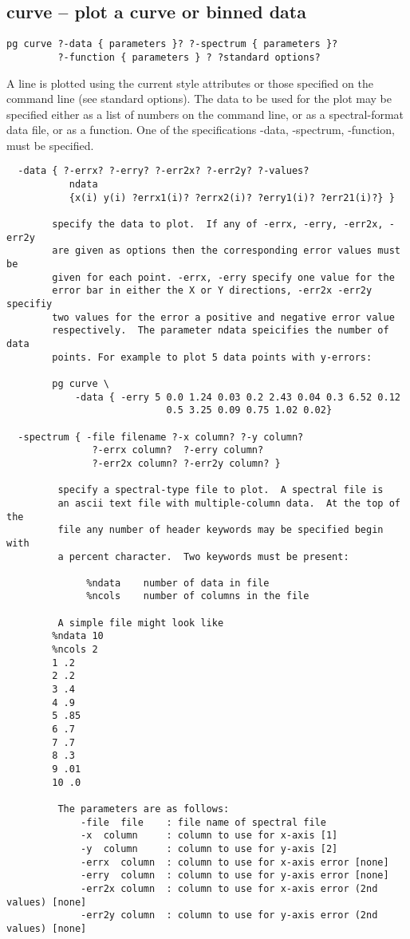 \subsection{curve -- plot a curve or binned data}
\begin{verbatim}
pg curve ?-data { parameters }? ?-spectrum { parameters }?
         ?-function { parameters } ? ?standard options?
\end{verbatim}
A line is plotted using the current style attributes or those
specified on the command line (see standard options). The data
to be used for the plot may be specified either as a list of
numbers on the command line, or as a spectral-format data file,
or as a function.  One of the specifications -data, -spectrum, 
-function, must be specified.
\begin{verbatim}
  -data { ?-errx? ?-erry? ?-err2x? ?-err2y? ?-values? 
           ndata 
           {x(i) y(i) ?errx1(i)? ?errx2(i)? ?erry1(i)? ?err21(i)?} }

        specify the data to plot.  If any of -errx, -erry, -err2x, -err2y
        are given as options then the corresponding error values must be
        given for each point. -errx, -erry specify one value for the
        error bar in either the X or Y directions, -err2x -err2y specifiy
        two values for the error a positive and negative error value
        respectively.  The parameter ndata speicifies the number of data
        points. For example to plot 5 data points with y-errors:

        pg curve \
            -data { -erry 5 0.0 1.24 0.03 0.2 2.43 0.04 0.3 6.52 0.12
                            0.5 3.25 0.09 0.75 1.02 0.02}

  -spectrum { -file filename ?-x column? ?-y column?
               ?-errx column?  ?-erry column?
               ?-err2x column? ?-err2y column? }

         specify a spectral-type file to plot.  A spectral file is
         an ascii text file with multiple-column data.  At the top of the
         file any number of header keywords may be specified begin with
         a percent character.  Two keywords must be present:

              %ndata    number of data in file
              %ncols    number of columns in the file

         A simple file might look like
		%ndata 10
		%ncols 2
		1 .2
		2 .2
		3 .4
		4 .9
		5 .85
		6 .7
		7 .7
		8 .3
		9 .01
		10 .0

         The parameters are as follows:
             -file  file    : file name of spectral file
             -x  column     : column to use for x-axis [1]
             -y  column     : column to use for y-axis [2]
             -errx  column  : column to use for x-axis error [none]
             -erry  column  : column to use for y-axis error [none]
             -err2x column  : column to use for x-axis error (2nd values) [none]
             -err2y column  : column to use for y-axis error (2nd values) [none]


\end{verbatim}

